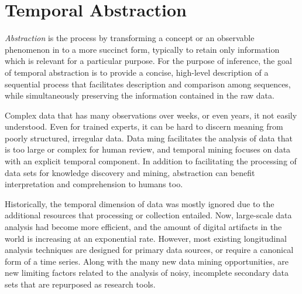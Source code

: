 \chapter{Temporal Abstraction}
\label{ch:abstraction}

\emph{Abstraction} is the process by transforming a concept or an observable phenomenon in to a more succinct form, typically to retain only information which is relevant for a particular purpose.  For the purpose of inference, the goal of temporal abstraction is to provide a concise, high-level description of a sequential process that facilitates description and comparison among sequences, while simultaneously preserving the information contained in the raw data.

Complex data that has many observations over weeks, or even years, it not easily understood.  Even for trained experts, it can be hard to discern meaning from poorly structured, irregular data.  Data ming facilitates the analysis of data that is too large or complex for human review, and temporal mining focuses on data with an explicit temporal component.  In addition to facilitating the processing of data sets for knowledge discovery and mining, abstraction can benefit interpretation and comprehension to humans too.

Historically, the temporal dimension of data was mostly ignored due to the additional resources that processing or collection entailed.  Now, large-scale data analysis had become more efficient, and the amount of digital artifacts in the world is increasing at an exponential rate.  However, most existing longitudinal analysis techniques are designed for primary data sources, or require a canonical form of a time series.   Along with the many new data mining opportunities, are new limiting factors related to the analysis of noisy, incomplete secondary data sets that are repurposed as research tools.


